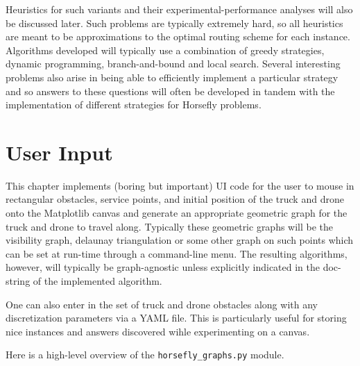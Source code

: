 \documentclass[11.5pt]{report}
\begin{document}
Heuristics for such variants and their experimental-performance analyses 
will also be discussed later. Such problems are typically extremely hard, so all heuristics are meant to be approximations to the optimal 
routing scheme for each instance. Algorithms developed will typically use a combination of greedy strategies, dynamic programming, branch-and-bound
and local search. Several interesting problems also arise in being able to efficiently implement a particular strategy and so answers to these questions
will often be developed in tandem with the implementation of different strategies for Horsefly problems. 


\chapter{User Input}

This chapter implements (boring  but important) UI code for the user to mouse in rectangular obstacles, service points, and initial position of the truck and drone onto 
the Matplotlib canvas and generate an appropriate geometric graph for the truck and drone to travel along. Typically these geometric graphs 
will be the visibility graph, delaunay triangulation or some other graph on such points which can be set at run-time through a command-line menu. 
The resulting algorithms, however, will typically be graph-agnostic unless explicitly indicated in the doc-string of the implemented algorithm. 

One can also enter in the set of truck and drone obstacles along with any discretization parameters via a YAML file. This is particularly useful 
for storing nice instances and answers discovered wihle experimenting on a canvas. 

Here is a high-level overview of the \verb|horsefly_graphs.py| module. 
\end{document}
